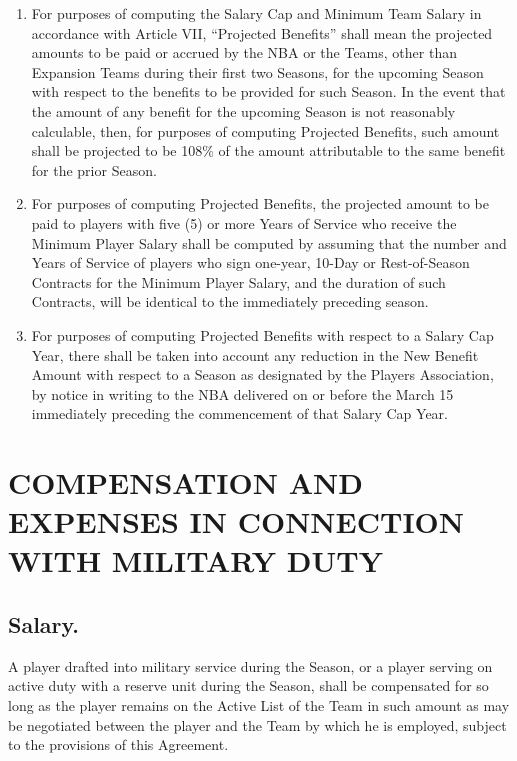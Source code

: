 \documentclass[
]{book}
\providecommand{\tightlist}{%
  \setlength{\itemsep}{0pt}\setlength{\parskip}{0pt}}
\begin{document}
\begin{enumerate}
\def\labelenumi{(\alph{enumi})}
\tightlist
\item
  For purposes of computing the Salary Cap and Minimum Team Salary in accordance with Article VII, ``Projected Benefits'' shall mean the projected amounts to be paid or accrued by the NBA or the Teams, other than Expansion Teams during their first two Seasons, for the upcoming Season with respect to the benefits to be provided for such Season. In the event that the amount of any benefit for the upcoming Season is not reasonably calculable, then, for purposes of computing Projected Benefits, such amount shall be projected to be 108\% of the amount attributable to the same benefit for the prior Season.
\item
  For purposes of computing Projected Benefits, the projected amount to be paid to players with five (5) or more Years of Service who receive the Minimum Player Salary shall be computed by assuming that the number and Years of Service of players who sign one-year, 10-Day or Rest-of-Season Contracts for the Minimum Player Salary, and the duration of such Contracts, will be identical to the immediately preceding season.
\item
  For purposes of computing Projected Benefits with respect to a Salary Cap Year, there shall be taken into account any reduction in the New Benefit Amount with respect to a Season as designated by the Players Association, by notice in writing to the NBA delivered on or before the March 15 immediately preceding the commencement of that Salary Cap Year.
\end{enumerate}

\hypertarget{compensation-and-expenses-in-connection-with-military-duty}{%
\chapter{COMPENSATION AND EXPENSES IN CONNECTION WITH MILITARY DUTY}\label{compensation-and-expenses-in-connection-with-military-duty}}


\hypertarget{salary.}{%
\section{Salary.}\label{salary.}}

A player drafted into military service during the Season, or a player serving on active duty with a reserve unit during the Season, shall be compensated for so long as the player remains on the Active List of the Team in such amount as may be negotiated between the player and the Team by which he is employed, subject to the provisions of this Agreement.
\end{document}
